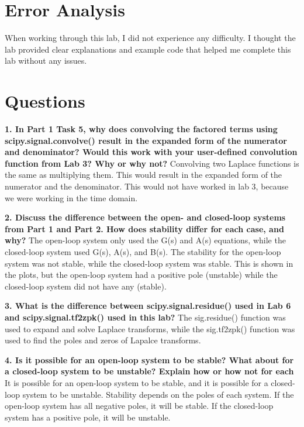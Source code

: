 \documentclass[12pt]{report}
\begin{document}
\section{Error Analysis}

When working through this lab, I did not experience any difficulty. I thought the lab provided clear explanations and example code that helped me complete this lab without any issues. 

\newpage

\section{Questions}

\textbf{1. In Part 1 Task 5, why does convolving the factored terms using scipy.signal.convolve()
result in the expanded form of the numerator and denominator? Would this work with your
user-defined convolution function from Lab 3? Why or why not?}
{Convolving two Laplace functions is the same as multiplying them. This would result in the expanded form of the numerator and the denominator. This would not have worked in lab 3, because we were working in the time domain. }

\textbf{2. Discuss the difference between the open- and closed-loop systems from Part 1 and Part 2.
How does stability differ for each case, and why?}
{The open-loop system only used the G(s) and A(s) equations, while the closed-loop system used G(s), A(s), and B(s). The stability for the open-loop system was not stable, while the closed-loop system was stable. This is shown in the plots, but the open-loop system had a positive pole (unstable) while the closed-loop system did not have any (stable).  }

\textbf{3. What is the difference between scipy.signal.residue() used in Lab 6 and
scipy.signal.tf2zpk() used in this lab?}
{The sig.residue() function was used to expand and solve Laplace transforms, while the sig.tf2zpk() function was used to find the poles and zeros of Lapalce transforms. }

\textbf{4. Is it possible for an open-loop system to be stable? What about for a closed-loop system to be unstable? Explain how or how not for each}
{It is possible for an open-loop system to be stable, and it is possible for a closed-loop system to be unstable. Stability depends on the poles of each system. If the open-loop system has all negative poles, it will be stable. If the closed-loop system has a positive pole, it will be unstable. }
\end{document}

